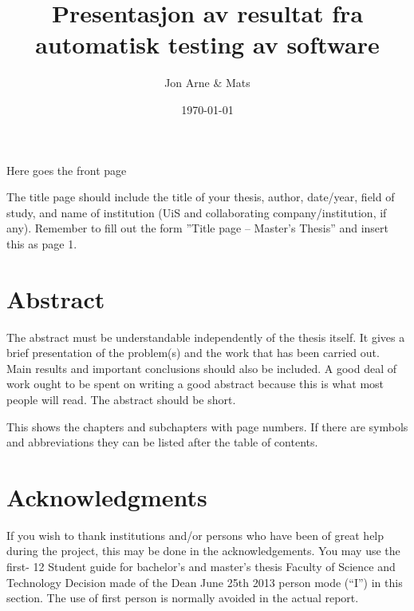 \documentclass{article}
\author{Jon Arne \& Mats}
\title{Presentasjon av resultat fra automatisk testing av software}
\date{\today}
\begin{document}
	
\begin{center}
\begin{Huge}
Here goes the front page
\end{Huge} 
\end{center}

\pagebreak
\maketitle
The title page should include the title of your thesis, author, date/year, field of
study, and name of institution (UiS and collaborating company/institution, if any). Remember
to fill out the form ”Title page – Master’s Thesis” and insert this as page 1. 
\pagebreak

\section{Abstract}
The abstract must be understandable independently of the thesis itself. It gives a
brief presentation of the problem(s) and the work that has been carried out. Main results and
important conclusions should also be included. A good deal of work ought to be spent on
writing a good abstract because this is what most people will read. The abstract should be
short. 
\pagebreak

\tableofcontents 
This shows the chapters and subchapters with page numbers. If there are
symbols and abbreviations they can be listed after the table of contents. 
\pagebreak

\section{Acknowledgments}
If you wish to thank institutions and/or persons who have been of great
help during the project, this may be done in the acknowledgements. You may use the first-
12
Student guide for bachelor’s and master’s thesis
Faculty of Science and Technology
Decision made of the Dean June 25th 2013
person mode (“I”) in this section. The use of first person is normally avoided in the actual
report. 
\pagebreak
\end{document}

